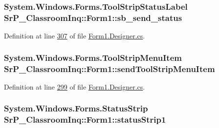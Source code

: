 \hypertarget{class_sr_p___classroom_inq_1_1_form1_a97b224eb10412293bdb533c770d8144d}{
\subsubsection[{sb\-\_\-send\-\_\-status}]{\setlength{\rightskip}{0pt plus 5cm}\-System.\-Windows.\-Forms.\-Tool\-Strip\-Status\-Label {\bf \-Sr\-P\-\_\-\-Classroom\-Inq\-::\-Form1\-::sb\-\_\-send\-\_\-status}}}
\label{class_sr_p___classroom_inq_1_1_form1_a97b224eb10412293bdb533c770d8144d}


\-Definition at line \hyperlink{_form1_8_designer_8cs_source_l00307}{307} of file \hyperlink{_form1_8_designer_8cs_source}{\-Form1.\-Designer.\-cs}.

\hypertarget{class_sr_p___classroom_inq_1_1_form1_ad2d5fd561e0a7b9572cc591b7056f5c4}{
\subsubsection[{send\-Tool\-Strip\-Menu\-Item}]{\setlength{\rightskip}{0pt plus 5cm}\-System.\-Windows.\-Forms.\-Tool\-Strip\-Menu\-Item {\bf \-Sr\-P\-\_\-\-Classroom\-Inq\-::\-Form1\-::send\-Tool\-Strip\-Menu\-Item}}}
\label{class_sr_p___classroom_inq_1_1_form1_ad2d5fd561e0a7b9572cc591b7056f5c4}


\-Definition at line \hyperlink{_form1_8_designer_8cs_source_l00299}{299} of file \hyperlink{_form1_8_designer_8cs_source}{\-Form1.\-Designer.\-cs}.

\hypertarget{class_sr_p___classroom_inq_1_1_form1_a9d7f098db073a545355aa922cca89b28}{
\subsubsection[{status\-Strip1}]{\setlength{\rightskip}{0pt plus 5cm}\-System.\-Windows.\-Forms.\-Status\-Strip {\bf \-Sr\-P\-\_\-\-Classroom\-Inq\-::\-Form1\-::status\-Strip1}}}
\label{class_sr_p___classroom_inq_1_1_form1_a9d7f098db073a545355aa922cca89b28}


